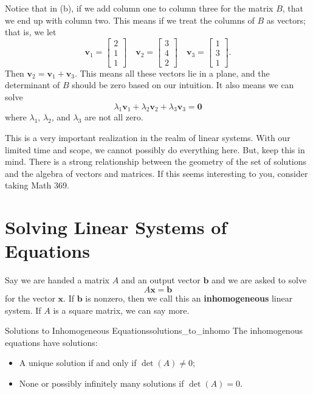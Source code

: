         \begin{remark}
        Notice that in (b), if we add column one to column three for the matrix $B$, that we end up with column two.  This means if we treat the columns of $B$ as vectors; that is, we let
        \[
        \mathbf{v}_1=\begin{bmatrix}
        2 \\ 1 \\ 1
        \end{bmatrix} \quad 
        \mathbf{v}_2= \begin{bmatrix} 3 \\ 4 \\ 2 \end{bmatrix} \quad
        \mathbf{v}_3= \begin{bmatrix} 1 \\ 3 \\ 1 \end{bmatrix}.
        \]
        Then $\mathbf{v}_2=\mathbf{v}_1+\mathbf{v}_3$.  This means all these vectors lie in a plane, and the determinant of $B$ should be zero based on our intuition.  It also means we can solve
        \[
        \lambda_1 \mathbf{v}_1 + \lambda_2 \mathbf{v}_2 + \lambda_3 \mathbf{v}_3 = \mathbf{0}
        \]
        where $\lambda_1$, $\lambda_2$, and $\lambda_3$ are not all zero.
        
        This is a very important realization in the realm of linear systems.  With our limited time and scope, we cannot possibly do everything here.  But, keep this in mind.  There is a strong relationship between the geometry of the set of solutions and the algebra of vectors and matrices.  If this seems interesting to you, consider taking Math 369.
        \end{remark}
        
        \section{Solving Linear Systems of Equations}
        Say we are handed a matrix $A$ and an output vector $\mathbf{b}$ and we are asked to solve
        \[
        A\mathbf{x}=\mathbf{b}
        \]
        for the vector $\mathbf{x}$. If $\mathbf{b}$ is nonzero, then we call this an \textbf{inhomogeneous} linear system. If $A$ is a square matrix, we can say more.
        
        \begin{prop}{Solutions to Inhomogeneous Equations}{solutions_to_inhomo}
        The inhomogenous equations have solutions:
        \begin{itemize}
            \item A unique solution if and only if $\det(A)\neq 0$;
            \item None or possibly infinitely many solutions if $\det(A)=0$.
        \end{itemize}
        \end{prop}
        
